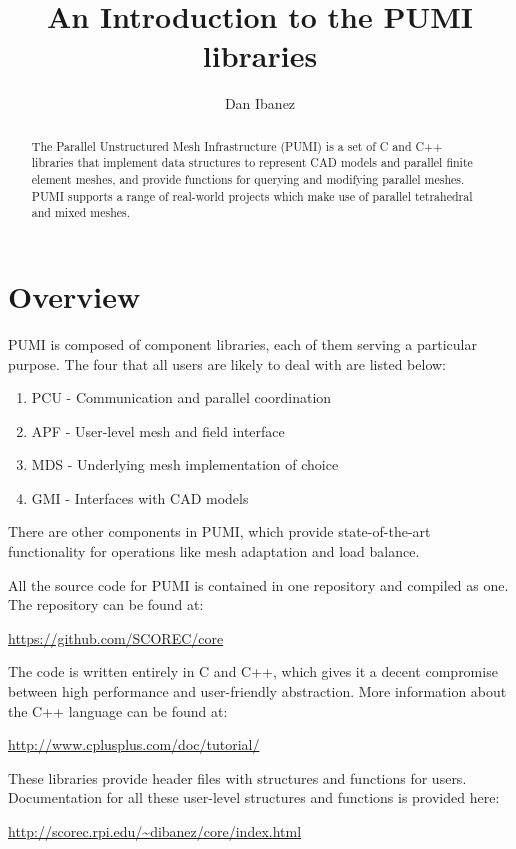\documentclass{article}
\author{Dan Ibanez}
\title{An Introduction to the PUMI libraries}
\begin{document}
\maketitle

\begin{abstract}
The Parallel Unstructured Mesh Infrastructure (PUMI) is
a set of C and C++ libraries that implement data
structures to represent CAD models and parallel
finite element meshes, and provide functions
for querying and modifying parallel meshes.
PUMI supports a range of real-world projects
which make use of parallel tetrahedral and
mixed meshes.
\end{abstract}

\section{Overview}
PUMI is composed of component libraries, each of
them serving a particular purpose.
The four that all users are likely to deal with
are listed below:

\begin{enumerate}
\item PCU - Communication and parallel coordination
\item APF - User-level mesh and field interface
\item MDS - Underlying mesh implementation of choice
\item GMI - Interfaces with CAD models
\end{enumerate}

There are other components in PUMI, which provide
state-of-the-art functionality for operations like
mesh adaptation and load balance.

All the source code for PUMI is contained in one
repository and compiled as one.
The repository can be found at:

\url{https://github.com/SCOREC/core}

The code is written entirely in C and C++, which
gives it a decent compromise between high performance
and user-friendly abstraction.
More information about the C++ language can be found at:

\url{http://www.cplusplus.com/doc/tutorial/}

These libraries provide header files with structures
and functions for users.
Documentation for all these user-level structures and functions
is provided here:

\url{http://scorec.rpi.edu/~dibanez/core/index.html}
\end{document}
